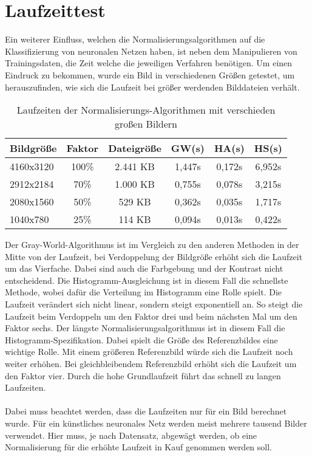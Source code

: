 \section{Laufzeittest}
Ein weiterer Einfluss, welchen die Normalisierungsalgorithmen auf die Klassifizierung von neuronalen Netzen haben, ist neben dem Manipulieren von Trainingsdaten, die Zeit welche die jeweiligen Verfahren benötigen. Um einen Eindruck zu bekommen, wurde ein Bild in verschiedenen Größen getestet, um herauszufinden, wie sich die Laufzeit bei größer werdenden Bilddateien verhält.
\begin{table}
[h]
\caption{Laufzeiten der Normalisierungs-Algorithmen mit verschieden großen Bildern}
\centering
\begin{tabular}{|l|c|c|c|c|c|}
\hline
Bildgröße & Faktor & Dateigröße & GW(s) & HA(s) & HS(s)\\
\hline
4160x3120 & 100\% & 2.441 KB & 1,447s & 0,172s & 6,952s\\
2912x2184 & 70\% & 1.000 KB & 0,755s & 0,078s & 3,215s\\
2080x1560 & 50\% & 529 KB & 0,362s & 0,035s & 1,717s\\
1040x780 & 25\% & 114 KB & 0,094s & 0,013s & 0,422s\\
\hline
\end{tabular}
\end{table}
Der Gray-World-Algorithmus ist im Vergleich zu den anderen Methoden in der Mitte von der Laufzeit, bei Verdoppelung der Bildgröße erhöht sich die Laufzeit um das Vierfache. Dabei sind auch die Farbgebung und der Kontrast nicht entscheidend. Die Histogramm-Ausgleichung ist in diesem Fall die schnellste Methode, wobei dafür die Verteilung im Histogramm eine Rolle spielt. Die Laufzeit verändert sich nicht linear, sondern steigt exponentiell an. So steigt die Laufzeit beim Verdoppeln um den Faktor drei und beim nächsten Mal um den Faktor sechs. Der längste Normalisierungsalgorithmus ist in diesem Fall die Histogramm-Spezifikation. Dabei spielt die Größe des Referenzbildes eine wichtige Rolle. Mit einem größeren Referenzbild würde sich die Laufzeit noch weiter erhöhen. Bei gleichbleibendem Referenzbild erhöht sich die Laufzeit um den Faktor vier. Durch die hohe Grundlaufzeit führt das schnell zu langen Laufzeiten.\\\\
Dabei muss beachtet werden, dass die Laufzeiten nur für ein Bild berechnet wurde. Für ein künstliches neuronales Netz werden meist mehrere tausend Bilder verwendet. Hier muss, je nach Datensatz, abgewägt werden, ob eine Normalisierung für die erhöhte Laufzeit in Kauf genommen werden soll.  